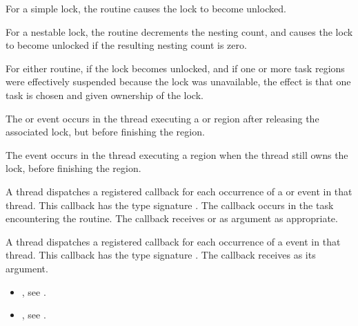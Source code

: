 
\effect
For a simple lock, the  routine causes the lock to become unlocked.

For a nestable lock, the  routine decrements the nesting 
count, and causes the lock to become unlocked if the resulting nesting count is zero.

For either routine, if the lock becomes unlocked, and if one or more task 
regions were effectively suspended because the lock was unavailable, the 
effect is that one task is chosen and given ownership of the lock. 

\events

The  or  event occurs in the thread 
executing a  or  region
after releasing the associated lock, but before finishing the region.

The  event occurs in the thread 
executing a  region
when the thread still owns the lock, 
before finishing the region.


\tools

A thread dispatches a registered 
callback for each occurrence of a  or  event 
in that thread.  This callback has the type signature .
The callback occurs in the task encountering
the routine. The callback receives  or 
  as  argument as appropriate.

A thread dispatches a registered 
callback for each occurrence of a  event 
in that thread. This callback has the type signature .
The callback receives  as its  argument.

\crossreferences
\begin{itemize}
\item {}, see
.
\item {}, see
.
\end{itemize}








